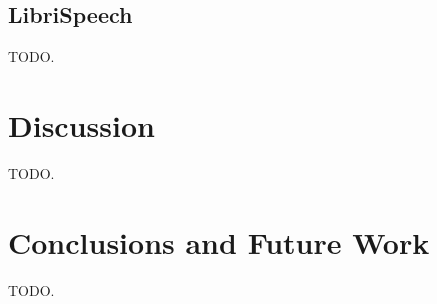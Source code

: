 \documentclass{article}
\begin{document}
\subsection{LibriSpeech}
TODO.

\section{Discussion}
TODO.

\section{Conclusions and Future Work}
TODO.


{\small
\linespread{1}

}
\end{document}
